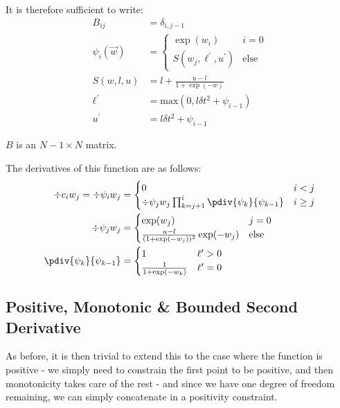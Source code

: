 \documentclass[]{article}
\begin{document}
				It is therefore sufficient to write:
				\begin{align}
					B_{ij} & = \delta_{i,j-1}
					\\
					\psi_i(\vec{w}) & = \begin{cases}
						\exp(w_i) & i = 0
						\\ 
						S(w_j,\ell^\prime,u^\prime) & \text{else}
					\end{cases}
					\\
					S(w,l,u) & = l + \frac{u- l}{1 + \exp(-w)}
					\\
					\ell^\prime &= \text{max}(0,l \delta t^2 + \psi_{i-1})
					\\
					u^\prime & = l \delta t^2 + \psi_{i-1}
				\end{align}

				$B$ is an $N-1 \times N$ matrix.

				The derivatives of this function are as follows:
				\begin{align}
					\div{c_i}{w_j} = \div{\psi_i}{w_j} & = \begin{cases} 0 & i < j
						\\
						\div{\psi_j}{w_j} \prod_{k = j+1}^i \pdiv{\psi_k}{\psi_{k-1}} & i\geq j
					\end{cases}
					\\
					\div{\psi_j}{w_j} & = \begin{cases} \exp(w_j) & j = 0
						\\
						\frac{u - l}{(1 + \exp(-w_j))^2} \exp(-w_j) & \text{else}
					\end{cases}
					\\
					\pdiv{\psi_k}{\psi_{k-1}} & = \begin{cases} 1 & \ell^\prime > 0
						\\
						\frac{1}{1 + \exp(-w_k)} & \ell^\prime = 0\end{cases}
				\end{align}
			\subsection{Positive, Monotonic \& Bounded Second Derivative}

				As before, it is then trivial to extend this to the case where the function is positive - we simply need to constrain the first point to be positive, and then monotonicity takes care of the rest - and since we have one degree of freedom remaining, we can simply concatenate in a positivity constraint.
\end{document}

